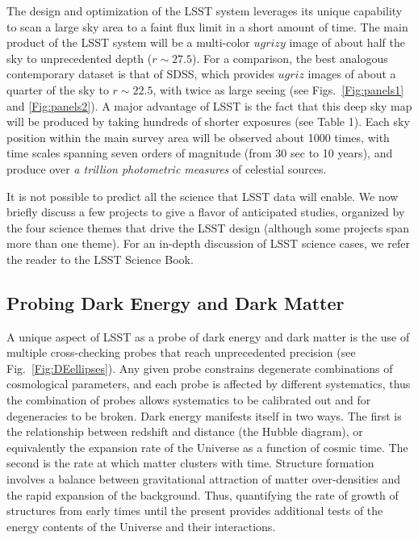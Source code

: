 \documentclass{emulateapj}
\newcommand{\B}[1]{{#1}}
\begin{document}
The design and optimization of the LSST system leverages its unique capability 
to scan a large sky area to a faint flux limit in a short amount of time. 
The main product of the LSST system will be a multi-color $ugrizy$ image of about 
half the sky to unprecedented depth ($r\sim27.5$). For a comparison, the best 
analogous contemporary dataset is that of SDSS, which provides $ugriz$ images
of about a quarter of the sky to $r\sim22.5$, with twice as large seeing
(see Figs.~\ref{Fig:panels1} and \ref{Fig:panels2}). A major advantage of LSST 
is the fact that this deep sky map will be produced by taking hundreds of
shorter exposures (see Table 1). Each sky position within the main survey area 
will be observed about 1000 times, with time scales spanning seven orders of 
magnitude (from 30 sec to 10 years), and produce over {\it a trillion 
photometric measures} of celestial sources.

It is not possible to predict all the science that LSST data will enable.
We now briefly discuss a few projects to give a flavor of anticipated studies,
organized by the four science themes that drive the LSST design 
(although some projects span more than one theme). 
\B{For an in-depth discussion of LSST science cases, we refer the reader to the 
LSST Science Book.}
 
\vskip 0.3in
\subsection{Probing Dark Energy and Dark Matter }

A unique aspect of LSST as a probe of dark energy and dark matter is
the use of multiple cross-checking probes that reach unprecedented
precision (see Fig.~\ref{Fig:DEellipses}). Any given probe constrains
degenerate combinations of cosmological parameters, and each probe is
affected by different systematics, thus the combination of probes
allows systematics to be calibrated out and for degeneracies to be
broken.  Dark energy manifests itself in two ways.  The first is the
relationship between redshift and distance (the Hubble diagram), or
equivalently the expansion rate of the Universe as a function of
cosmic time.  The second is the rate at which matter clusters with
time.  
Structure formation involves a balance between
gravitational attraction of matter over-densities and the rapid
expansion of the background.  Thus, quantifying the rate of growth of
structures from early times until the present provides additional
tests of the energy contents of the Universe and their interactions.
\end{document}
